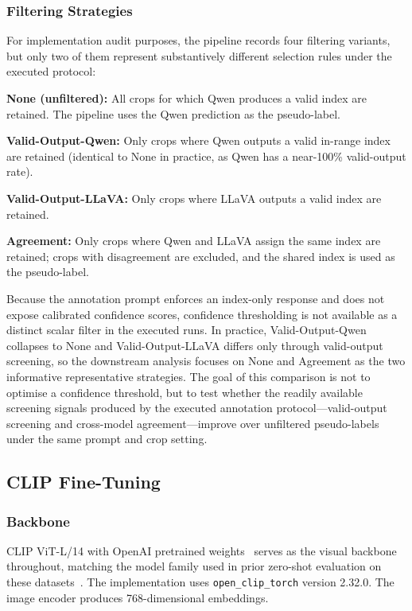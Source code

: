 \documentclass{ieeeaccess}
\begin{document}
\subsubsection{Filtering Strategies}

For implementation audit purposes, the pipeline records four filtering
variants, but only two of them represent substantively different
selection rules under the executed protocol:

\noindent\textbf{None (unfiltered):} All crops for which Qwen
produces a valid index are retained.
The pipeline uses the Qwen prediction as the pseudo-label.

\noindent\textbf{Valid-Output-Qwen:} Only crops where Qwen outputs
a valid in-range index are retained (identical to None in
practice, as Qwen has a near-100\% valid-output rate).

\noindent\textbf{Valid-Output-LLaVA:} Only crops where LLaVA outputs
a valid index are retained.

\noindent\textbf{Agreement:} Only crops where Qwen and LLaVA assign
the same index are retained; crops with disagreement are excluded,
and the shared index is used as the pseudo-label.

Because the annotation prompt enforces an index-only response and does
not expose calibrated confidence scores, confidence thresholding is not
available as a distinct scalar filter in the executed runs.
In practice, Valid-Output-Qwen collapses to None and Valid-Output-LLaVA
differs only through valid-output screening, so the
downstream analysis focuses on None and Agreement as the two
informative representative strategies.
The goal of this comparison is not to optimise a confidence
threshold, but to test whether the readily available screening signals
produced by the executed annotation protocol---valid-output screening
and cross-model agreement---improve over unfiltered pseudo-labels under
the same prompt and crop setting.

\subsection{CLIP Fine-Tuning}
\label{sec:finetune}

\subsubsection{Backbone}

CLIP ViT-L/14 with OpenAI pretrained
weights~\cite{radford2021learning} serves as the visual backbone
throughout,
matching the model family used in prior zero-shot evaluation on these
datasets~\cite{scb_dataset}.
The implementation uses \texttt{open\_clip\_torch} version 2.32.0.
The image encoder produces 768-dimensional embeddings.
\end{document}

